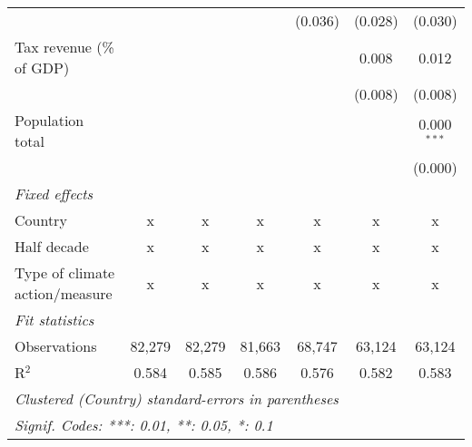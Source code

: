 \begin{tabular}{lcccccc}
                                                          &         &              &         & (0.036)      & (0.028)      & (0.030)\\   
   Tax revenue (\% of GDP)                                &         &              &         &              & 0.008        & 0.012\\   
                                                          &         &              &         &              & (0.008)      & (0.008)\\   
   Population total                                       &         &              &         &              &              & 0.000$^{***}$\\   
                                                          &         &              &         &              &              & (0.000)\\   
   \emph{Fixed effects}\\
   Country                                                & x       & x            & x       & x            & x            & x\\  
   Half decade                                            & x       & x            & x       & x            & x            & x\\  
   Type of climate action/measure                         & x       & x            & x       & x            & x            & x\\  
   \midrule \emph{Fit statistics}\\
   Observations                                           & 82,279  & 82,279       & 81,663  & 68,747       & 63,124       & 63,124\\  
   R$^2$                                                  & 0.584   & 0.585        & 0.586   & 0.576        & 0.582        & 0.583\\  
   \midrule
   \multicolumn{7}{l}{\emph{Clustered (Country) standard-errors in parentheses}}\\
   \multicolumn{7}{l}{\emph{Signif. Codes: ***: 0.01, **: 0.05, *: 0.1}}\\
\end{tabular}
\par\endgroup


